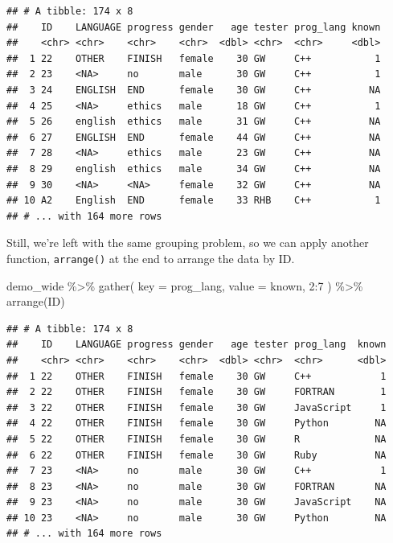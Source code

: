 \documentclass[
]{book}
\newenvironment{Shaded}{\begin{snugshade}}{\end{snugshade}}
\newcommand{\AttributeTok}[1]{\textcolor[rgb]{0.77,0.63,0.00}{#1}}
\newcommand{\DecValTok}[1]{\textcolor[rgb]{0.00,0.00,0.81}{#1}}
\newcommand{\FunctionTok}[1]{\textcolor[rgb]{0.00,0.00,0.00}{#1}}
\newcommand{\NormalTok}[1]{#1}
\newcommand{\SpecialCharTok}[1]{\textcolor[rgb]{0.00,0.00,0.00}{#1}}
\begin{document}
\begin{verbatim}
## # A tibble: 174 x 8
##    ID    LANGUAGE progress gender   age tester prog_lang known
##    <chr> <chr>    <chr>    <chr>  <dbl> <chr>  <chr>     <dbl>
##  1 22    OTHER    FINISH   female    30 GW     C++           1
##  2 23    <NA>     no       male      30 GW     C++           1
##  3 24    ENGLISH  END      female    30 GW     C++          NA
##  4 25    <NA>     ethics   male      18 GW     C++           1
##  5 26    english  ethics   male      31 GW     C++          NA
##  6 27    ENGLISH  END      female    44 GW     C++          NA
##  7 28    <NA>     ethics   male      23 GW     C++          NA
##  8 29    english  ethics   male      34 GW     C++          NA
##  9 30    <NA>     <NA>     female    32 GW     C++          NA
## 10 A2    English  END      female    33 RHB    C++           1
## # ... with 164 more rows
\end{verbatim}

Still, we're left with the same grouping problem, so we can apply another function, \texttt{arrange()} at the end to arrange the data by ID.

\begin{Shaded}
\begin{Highlighting}[]
\NormalTok{demo\_wide }\SpecialCharTok{\%\textgreater{}\%} 
  \FunctionTok{gather}\NormalTok{(}
    \AttributeTok{key =}\NormalTok{ prog\_lang,}
    \AttributeTok{value =}\NormalTok{ known,}
    \DecValTok{2}\SpecialCharTok{:}\DecValTok{7}
\NormalTok{    ) }\SpecialCharTok{\%\textgreater{}\%}
  \FunctionTok{arrange}\NormalTok{(ID)}
\end{Highlighting}
\end{Shaded}

\begin{verbatim}
## # A tibble: 174 x 8
##    ID    LANGUAGE progress gender   age tester prog_lang  known
##    <chr> <chr>    <chr>    <chr>  <dbl> <chr>  <chr>      <dbl>
##  1 22    OTHER    FINISH   female    30 GW     C++            1
##  2 22    OTHER    FINISH   female    30 GW     FORTRAN        1
##  3 22    OTHER    FINISH   female    30 GW     JavaScript     1
##  4 22    OTHER    FINISH   female    30 GW     Python        NA
##  5 22    OTHER    FINISH   female    30 GW     R             NA
##  6 22    OTHER    FINISH   female    30 GW     Ruby          NA
##  7 23    <NA>     no       male      30 GW     C++            1
##  8 23    <NA>     no       male      30 GW     FORTRAN       NA
##  9 23    <NA>     no       male      30 GW     JavaScript    NA
## 10 23    <NA>     no       male      30 GW     Python        NA
## # ... with 164 more rows
\end{verbatim}
\end{document}
